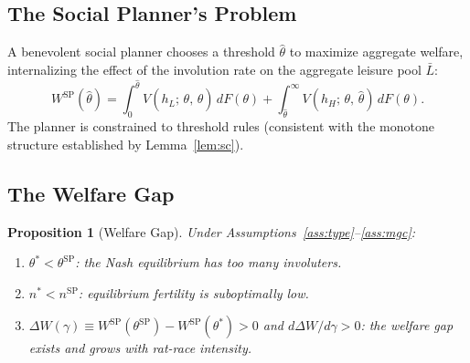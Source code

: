 \documentclass[12pt]{article}
\theoremstyle{plain}
\newtheorem{proposition}{Proposition}
\theoremstyle{definition}
\theoremstyle{remark}
\newcommand{\tstar}{\theta^{*}}
\newcommand{\tsp}{\theta^{\mathrm{SP}}}
\newcommand{\Lbar}{\bar{L}}
\newcommand{\hH}{h_{H}}
\newcommand{\hL}{h_{L}}
\newcommand{\DeltaW}{\Delta W}
\begin{document}
\subsection{The Social Planner's Problem}

A benevolent social planner chooses a threshold $\hat\theta$ to maximize aggregate
welfare, internalizing the effect of the involution rate on the aggregate leisure
pool $\Lbar$:
\begin{equation}
  W^{\mathrm{SP}}(\hat\theta)
  = \int_{0}^{\hat\theta} V(\hL;\,\theta,\,\hat\theta)\,dF(\theta)
  + \int_{\hat\theta}^{\infty} V(\hH;\,\theta,\,\hat\theta)\,dF(\theta).
  \label{eq:Wsp}
\end{equation}
The planner is constrained to threshold rules (consistent with the monotone
structure established by Lemma~\ref{lem:sc}).

\subsection{The Welfare Gap}

\begin{proposition}[Welfare Gap]
\label{prop:welfare}
Under Assumptions~\ref{ass:type}--\ref{ass:mgc}:
\begin{enumerate}
  \item[\textup{(i)}] $\tstar < \tsp$: the Nash equilibrium has too many involuters.
  \item[\textup{(ii)}] $n^{*} < n^{\mathrm{SP}}$: equilibrium fertility is suboptimally low.
  \item[\textup{(iii)}] $\DeltaW(\gamma) \equiv W^{\mathrm{SP}}(\tsp) - W^{\mathrm{SP}}(\tstar) > 0$
    and $d\DeltaW/d\gamma > 0$: the welfare gap exists and grows with rat-race intensity.
\end{enumerate}
\end{proposition}
\end{document}
